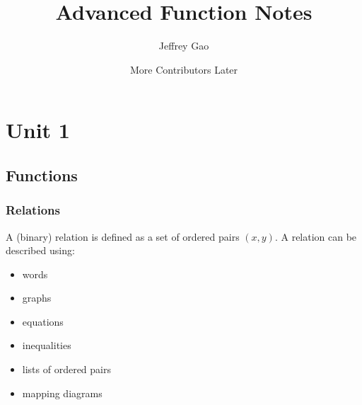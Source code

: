 \documentclass{article}
\title{\vspace{-3ex}Advanced Function Notes}
\author{Jeffrey Gao\and More Contributors Later}
\begin{document}
	\maketitle
	\section{Unit 1}
	\subsection{Functions}
	\subsubsection{Relations}
	A (binary) relation is defined as a set of ordered pairs $(x, y)$.
	A relation can be described using:
	\begin{itemize}
		\item words
		\item graphs
		\item equations
		\item inequalities
		\item lists of ordered pairs
		\item mapping diagrams 

	\end{itemize}
\end{document}
